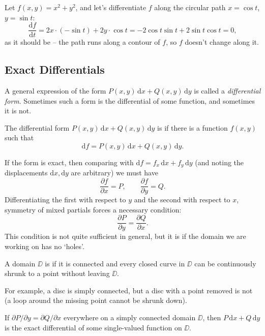 \begin{example}
	Let $f(x, y) = x^2 + y^2$, and let's differentiate $f$ along the circular path $x = \cos t$, $y = \sin t$:
	$$
	\frac{\mathrm{d}f}{\mathrm{d}t} = 2x \cdot (-\sin t) + 2y \cdot \cos t = -2\cos t \sin t + 2 \sin t \cos t = 0,
	$$
	as it should be -- the path runs along a contour of $f$, so $f$ doesn't change along it.
\end{example}

\subsection{Exact Differentials}

A general expression of the form $P(x, y)\, \mathrm{d}x + Q(x, y) \, \mathrm{d}y$ is called a \emph{differential form}. Sometimes such a form is the differential of some function, and sometimes it is not.

\begin{definition}
	The differential form $P(x, y)\,\mathrm{d}x + Q(x, y)\,\mathrm{d}y$ is  if there is a function $f(x, y)$ such that
	$$
	\mathrm{d}f = P(x, y)\,\mathrm{d}x + Q(x, y)\,\mathrm{d}y.
	$$
\end{definition}

If the form is exact, then comparing with $\mathrm{d}f = f_x \, \mathrm{d}x + f_y \, \mathrm{d}y$ (and noting the displacements $\mathrm{d}x, \mathrm{d}y$ are arbitrary) we must have
$$
\frac{\partial f}{\partial x} = P, \qquad \frac{\partial f}{\partial y} = Q.
$$
Differentiating the first with respect to $y$ and the second with respect to $x$, symmetry of mixed partials forces a necessary condition:
$$
\frac{\partial P}{\partial y} = \frac{\partial Q}{\partial x}.
$$
This condition is not quite sufficient in general, but it is if the domain we are working on has no `holes'.

\begin{definition}
	A domain $\DD$ is  if it is connected and every closed curve in $\DD$ can be continuously shrunk to a point without leaving $\DD$.
\end{definition}

For example, a disc is simply connected, but a disc with a point removed is not (a loop around the missing point cannot be shrunk down).

\begin{theorem}
	If $\partial P/\partial y = \partial Q/\partial x$ everywhere on a simply connected domain $\DD$, then $P \, \mathrm{d}x + Q \, \mathrm{d}y$ is the exact differential of some single-valued function on $\DD$.
\end{theorem}

